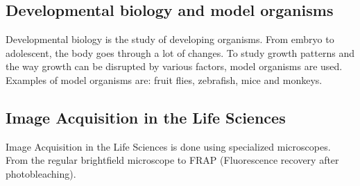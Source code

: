 
\subsection{Developmental biology and model organisms}

Developmental biology is the study of
developing organisms. From embryo to
adolescent, the body goes through a lot
of changes. To study growth patterns and the way growth can be
disrupted by various factors, model organisms
are used. Examples of model organisms are: fruit flies, zebrafish,
mice and monkeys.


\subsection{Image Acquisition in the Life Sciences}

Image Acquisition in the Life Sciences is done using specialized
microscopes. From the regular brightfield
microscope to FRAP (Fluorescence
recovery after photobleaching).
